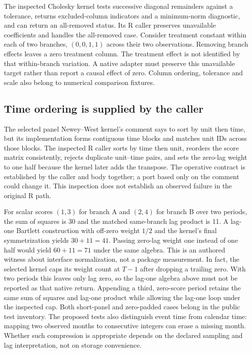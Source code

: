 The inspected Cholesky kernel tests successive diagonal remainders against
a tolerance, returns excluded-column indicators and a minimum-norm diagnostic,
and can return an all-removed status. Its R caller preserves unavailable
coefficients and handles the all-removed case. Consider treatment constant
within each of two branches, $(0,0,1,1)$ across their two observations.
Removing branch effects leaves a zero treatment column. The treatment effect
is not identified by that within-branch variation. A native adapter must
preserve this unavailable target rather than report a causal effect of zero.
Column ordering, tolerance and scale also belong to numerical comparison
fixtures.\citep{exec25_panelcxx_fixest,exec20_fixest_source,exec25_panelcxx_reference}

\subsection{Time ordering is supplied by the caller}
The selected panel Newey--West kernel's comment says to sort by unit then
time, but its implementation forms contiguous time blocks and matches unit
IDs across those blocks. The inspected R caller sorts by time then unit,
reorders the score matrix consistently, rejects duplicate unit--time pairs,
and sets the zero-lag weight to one half because the kernel later adds the
transpose. The operative contract is established by the caller and body
together; a port based only on the comment could change it. This inspection
does not establish an observed failure in the original R path.
\citep{exec25_panelcxx_fixest,exec20_fixest_source}

For scalar scores $(1,3)$ for branch A and $(2,4)$ for branch B over two
periods, the sum of squares is 30 and the matched same-branch lag product
is 11. A lag-one Bartlett construction with off-zero weight $1/2$ and the
kernel's final symmetrization yields $30+11=41$. Passing zero-lag weight
one instead of one half would yield $60+11=71$ under the same algebra.
This is an authored witness about interface normalization, not a package
measurement. In fact, the selected kernel caps its weight count at $T-1$
after dropping a trailing zero. With two periods this leaves only lag zero,
so the lag-one algebra above must not be reported as that native return.
Appending a third, zero-score period retains the same sum of squares and
lag-one product while allowing the lag-one loop under the inspected cap.
Both short-panel and zero-padded cases belong in the public test inventory.
\citep{exec25_panelcxx_fixest,exec25_panelcxx_reference} The proposed tests also distinguish event time from calendar
time: mapping two observed months to consecutive integers can erase a
missing month. Whether such compression is appropriate depends on the
declared sampling and lag interpretation, not on storage convenience.
\citep{exec25_panelcxx_reference}

